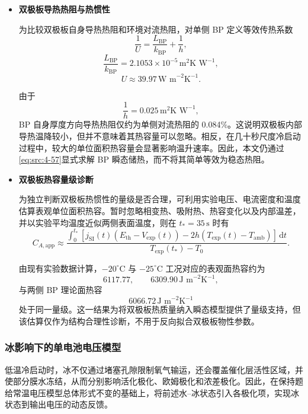 \documentclass[bwprint]{gmcmthesis}
\numberwithin{equation}{section}
\numberwithin{figure}{section}
\begin{document}
\begin{itemize}
 若两侧表面温度近似相同，则有
\[
q_{\text{loss},A} \approx 2h(T - T_{\text{amb}}),
\]
我们不能在整体能量平衡中遗漏任意一侧环境散热。

\item \textbf {双极板导热热阻与热惯性}

为比较双极板自身导热热阻和环境对流热阻，对单侧 BP 定义等效传热系数
\[
\frac{1}{U} = \frac{L_{\text{BP}}}{k_{\text{BP}}} + \frac{1}{h},
\]
\[
\frac{L_{\text{BP}}}{k_{\text{BP}}} = 2.1053 \times 10^{-5} \, \text{m}^2\text{K W}^{-1},
\]
\begin{equation}
U \approx 39.97 \, \text{W m}^{-2}\text{K}^{-1}. \label{eq:src:4-70}
\end{equation}

 由于
\[
\frac{1}{h} = 0.025 \, \text{m}^2\text{K W}^{-1},
\]
BP 自身厚度方向导热热阻仅约为单侧对流热阻的 0.084\%。这说明双极板内部导热温降较小，但并不意味着其热容量可以忽略。相反，在几十秒尺度冷启动过程中，较大的单位面积热容量会显著影响温升速率。因此，本文仍通过\eqref{eq:src:4-57}显式求解 BP 瞬态储热，而不将其简单等效为稳态热阻。


\item \textbf {双极板热容量级诊断}


为独立判断双极板热惯性的量级是否合理，可利用实验电压、电流密度和温度估算表观单位面积热容。暂时忽略相变热、吸附热、热容变化以及内部温差，并以实验平均温度近似两侧表面温度，则在 \(t_* = 35 \, \text{s}\) 时有
\begin{equation}
C_{A,\text{app}} \approx \frac{\int_0^{t_*} [j_{\mathrm{SI}}(t)(E_{\text{th}} - V_{\text{exp}}(t)) - 2h(T_{\text{exp}}(t) - T_{\text{amb}})] \, \mathrm{d}t}{T_{\text{exp}}(t_*) - T_0}. \label{eq:src:4-71}
\end{equation}

 由现有实验数据计算，\(-20^\circ\text{C}\) 与 \(-25^\circ\text{C}\) 工况对应的表观面热容约为
\[
6117.77, \qquad 6309.90 \, \text{J m}^{-2}\text{K}^{-1},
\]
与两侧 BP 理论面热容
\[
6066.72 \, \text{J m}^{-2}\text{K}^{-1}
\]
处于同一量级。这一结果为将双极板热质量纳入瞬态模型提供了量级支持，但该估算仅作为结构合理性诊断，不用于反向拟合双极板物性参数。

\end{itemize}

\subsubsection{冰影响下的单电池电压模型}
低温冷启动时，冰不仅通过堵塞孔隙限制氧气输运，还会覆盖催化层活性区域，并使部分膜水冻结，从而分别影响活化极化、欧姆极化和浓差极化。因此，在保持题给常温电压模型总体形式不变的基础上，将前述水–冰状态引入各极化项，实现冰状态到输出电压的动态反馈。
\end{document}
